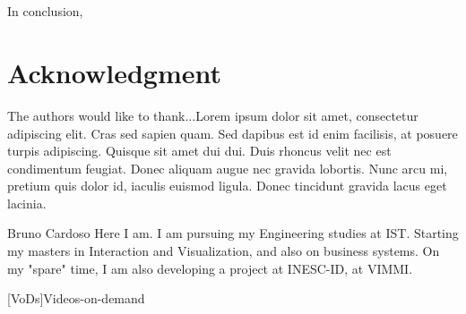 \documentclass[a4paper,12pt,journal,twoside,compsoc]{PPIEEEtran}
\begin{document}
\section{}
In conclusion, 
\ifCLASSOPTIONcompsoc
  \section*{} %
\else
  \section*{Acknowledgment}
\fi

The authors would like to thank...Lorem ipsum dolor sit amet, consectetur adipiscing elit. Cras sed sapien quam. Sed dapibus est id enim facilisis, at posuere turpis adipiscing. Quisque sit amet dui dui.
Duis rhoncus velit nec est condimentum feugiat. Donec aliquam augue nec gravida lobortis. Nunc arcu mi, pretium quis dolor id, iaculis euismod ligula. Donec tincidunt gravida lacus eget lacinia.

%

% 
\begin{IEEEbiography}{Bruno Cardoso}
Here I am. I am pursuing my Engineering studies at \ac{IST}. Starting my masters in Interaction and Visualization, and also on business systems. On my "spare" time, I am also developing a project at INESC-ID, at VIMMI.
\end{IEEEbiography}



	[VoDs]{Videos-on-demand}
	
\end{document}
